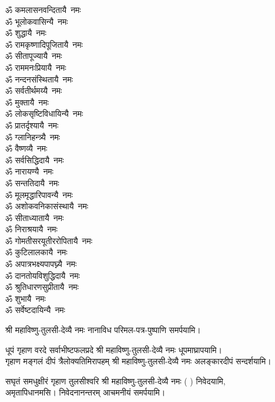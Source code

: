 \begin{multicols}{2}
\begin{flushleft}
ॐ कमलासनवन्दितायै~नमः\\
ॐ भूलोकवासिन्यै~नमः\\
ॐ शुद्धायै~नमः\\
ॐ रामकृष्णादिपूजितायै~नमः\\
ॐ सीतापूज्यायै~नमः\\
ॐ राममनःप्रियायै~नमः\\
ॐ नन्दनसंस्थितायै~नमः\\
ॐ सर्वतीर्थमय्यै~नमः\\
ॐ मुक्तायै~नमः\hfill{}‌\\
ॐ लोकसृष्टिविधायिन्यै~नमः\\
ॐ प्रातर्दृश्यायै~नमः\\
ॐ ग्लानिहन्त्र्यै~नमः\\
ॐ वैष्णव्यै~नमः\\
ॐ सर्वसिद्धिदायै~नमः\\
ॐ नारायण्यै~नमः\\
ॐ सन्ततिदायै~नमः\\
ॐ मूलमृद्धारिपावन्यै~नमः\\
ॐ अशोकवनिकासंस्थायै~नमः\\
ॐ सीताध्यातायै~नमः\hfill{}‌\\
ॐ निराश्रयायै~नमः\\
ॐ गोमतीसरयूतीररोपितायै~नमः\\
ॐ कुटिलालकायै~नमः\\
ॐ अपात्रभक्ष्यपापघ्न्यै~नमः\\
ॐ दानतोयविशुद्धिदायै~नमः\\
ॐ श्रुतिधारणसुप्रीतायै~नमः\\
ॐ शुभायै~नमः\\
ॐ सर्वेष्टदायिन्यै~नमः\hfill{}\\
\end{flushleft}
\end{multicols}
श्री महाविष्णु-तुलसी-देव्यै नमः नानाविध परिमल-पत्र-पुष्पाणि समर्पयामि।



{धूपं गृहाण वरदे सर्वाभीष्टफलप्रदे}
श्री महाविष्णु-तुलसी-देव्यै नमः धूपमाघ्रापयामि।\\

{गृहाण मङ्गलं दीपं त्रैलोक्यतिमिरापहम्}
श्री महाविष्णु-तुलसी-देव्यै नमः अलङ्कारदीपं सन्दर्शयामि।

{सघृतं समधुक्षीरं गृहाण तुलसीश्वरि}
श्री महाविष्णु-तुलसी-देव्यै नमः (	) निवेदयामि, \\
अमृतापिधानमसि। निवेदनानन्तरम् आचमनीयं समर्पयामि।

